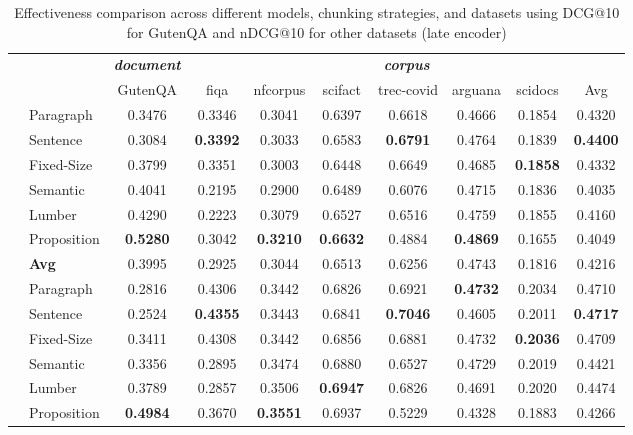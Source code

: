 \begin{table}[htbp]
	\centering
	\caption{Effectiveness comparison across different models, chunking strategies, and datasets using DCG@10 for GutenQA and nDCG@10 for other datasets (late encoder)}
	\label{tab:results_late_encoder}
	\begin{tabular}{llcccccccc}
		\toprule
		&  & \multicolumn{1}{c}{\textbf{\textit{document}}} & \multicolumn{7}{c}{\textbf{\textit{corpus}}} \\
		\cmidrule(lr){3-3} \cmidrule(lr){4-10}
		&  & GutenQA & fiqa & nfcorpus & scifact & trec-covid & arguana & scidocs & Avg \\
		\midrule
		\multirow{6}{*}{\rotatebox{90}{\textbf{Jina-v2}}} & Paragraph & 0.3476 & 0.3346 & 0.3041 & 0.6397 & 0.6618 & 0.4666 & 0.1854 & 0.4320 \\
		& Sentence & 0.3084 & \textbf{0.3392} & 0.3033 & 0.6583 & \textbf{0.6791} & 0.4764 & 0.1839 & \textbf{0.4400} \\
		& Fixed-Size & 0.3799 & 0.3351 & 0.3003 & 0.6448 & 0.6649 & 0.4685 & \textbf{0.1858} & 0.4332 \\
		& Semantic & 0.4041 & 0.2195 & 0.2900 & 0.6489 & 0.6076 & 0.4715 & 0.1836 & 0.4035 \\
		& Lumber & 0.4290 & 0.2223 & 0.3079 & 0.6527 & 0.6516 & 0.4759 & 0.1855 & 0.4160 \\
		& Proposition & \textbf{0.5280} & 0.3042 & \textbf{0.3210} & \textbf{0.6632} & 0.4884 & \textbf{0.4869} & 0.1655 & 0.4049 \\
		& \textbf{Avg} & 0.3995 & 0.2925 & 0.3044 & 0.6513 & 0.6256 & 0.4743 & 0.1816 & 0.4216 \\
		\midrule
		\multirow{6}{*}{\rotatebox{90}{\textbf{Jina-v3}}} & Paragraph & 0.2816 & 0.4306 & 0.3442 & 0.6826 & 0.6921 & \textbf{0.4732} & 0.2034 & 0.4710 \\
		& Sentence & 0.2524 & \textbf{0.4355} & 0.3443 & 0.6841 & \textbf{0.7046} & 0.4605 & 0.2011 & \textbf{0.4717} \\
		& Fixed-Size & 0.3411 & 0.4308 & 0.3442 & 0.6856 & 0.6881 & 0.4732 & \textbf{0.2036} & 0.4709 \\
		& Semantic & 0.3356 & 0.2895 & 0.3474 & 0.6880 & 0.6527 & 0.4729 & 0.2019 & 0.4421 \\
		& Lumber & 0.3789 & 0.2857 & 0.3506 & \textbf{0.6947} & 0.6826 & 0.4691 & 0.2020 & 0.4474 \\
		& Proposition & \textbf{0.4984} & 0.3670 & \textbf{0.3551} & 0.6937 & 0.5229 & 0.4328 & 0.1883 & 0.4266 \\

\end{tabular}
\end{table}
